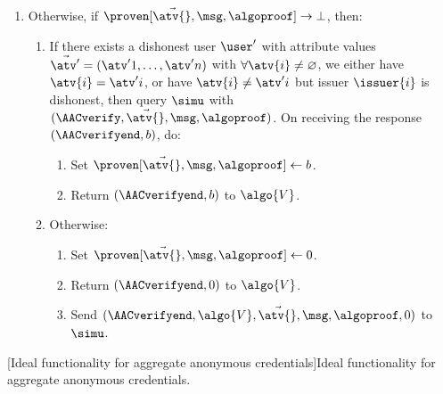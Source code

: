 \begin{framed}
\begin{enumerate}
	    \begin{enumerate}

	      \item Return $(\AACverifyend, 1)$ to the verifier.

	      \item Send $(\AACverifyend, \algo{V}, \vec{\atv{}}, \msg,
\algoproof, \allowbreak 1)$ to $\simu$.

	    \end{enumerate}

	  \item Otherwise, if $\proven[\vec{\atv{}}, \msg, \algoproof]
\rightarrow \bot$, then:

	    \begin{enumerate}

	      \item If there exists a dishonest user $\user'$ with attribute
values $\vec{\atv'{}} = (\atv'{1}, \ldots, \atv'{n})$ with $\forall \atv{i} \neq
\varnothing$, we either have $\atv{i} = \atv'{i}$, or have $\atv{i} \neq
\atv'{i}$ but issuer $\issuer{i}$ is dishonest, then query $\simu$ with
$(\AACverify, \vec{\atv{}}, \msg,\algoproof)$. On receiving the response
$(\AACverifyend, b)$, do:

		\begin{enumerate}

		  \item Set $\proven[\vec{\atv{}}, \msg, \algoproof] \leftarrow
b$.

		  \item Return $(\AACverifyend, b)$ to $\algo{V}$.

		\end{enumerate}

	      \item Otherwise:

		\begin{enumerate}

		  \item Set $\proven[\vec{\atv{}}, \msg, \algoproof] \leftarrow
0$.

		  \item Return $(\AACverifyend, 0)$ to $\algo{V}$.

		  \item Send $(\AACverifyend, \algo{V}, \vec{\atv{}}, \msg,
\allowbreak \algoproof, \allowbreak 0)$ to $\simu$.

		\end{enumerate}

	    \end{enumerate}

	\end{enumerate}

    \end{framed}

[Ideal functionality for aggregate anonymous credentials]{Ideal functionality for aggregate anonymous
credentials.}\label{fig:agg-creds-faac}
